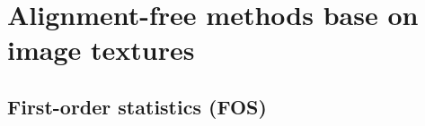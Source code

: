 \documentclass[10pt]{beamer}
\newcommand{\1}{
	\setbeamertemplate{background}{
		\texttt{[image: img/1\_dna]}
		\tikz[overlay] \fill[fill opacity=0.75,fill=white] (0,0) rectangle (-\paperwidth,\paperheight);
	}
}
\begin{document}
\section{Alignment-free methods base on image textures}

\subsection{First-order statistics (FOS)} \label{section:fos}


\end{document}
